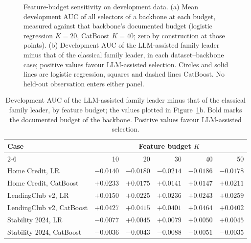 \documentclass[final,5p,twocolumn]{elsarticle}
\newcommand{\Kfeat}{K}
\begin{document}
\begin{figure}[htbp]
\caption{Feature-budget sensitivity on development data. (a) Mean development AUC of all selectors of a backbone at each budget, measured against that backbone's documented budget (logistic regression $\Kfeat=20$, CatBoost $\Kfeat=40$; zero by construction at those points). (b) Development AUC of the LLM-assisted family leader minus that of the classical family leader, in each dataset--backbone case; positive values favour LLM-assisted selection. Circles and solid lines are logistic regression, squares and dashed lines CatBoost. No held-out observation enters either panel.}
\label{fig:budgets}
\end{figure}

\begin{table}[htbp]
\centering
\footnotesize
\begin{threeparttable}
\caption{Development AUC of the LLM-assisted family leader minus that of the classical family leader, by feature budget; the values plotted in Figure~\ref{fig:budgets}b. Bold marks the documented budget of the backbone. Positive values favour LLM-assisted selection.}
\label{tab:budgets}
\setlength{\tabcolsep}{4pt}
\begin{tabular}{@{}lrrrrr@{}}
\toprule
Case & \multicolumn{5}{c}{Feature budget $\Kfeat$} \\
\cmidrule(l){2-6}
 & 10 & 20 & 30 & 40 & 50 \\
\midrule
Home Credit, LR & $-0.0140$ & $\mathbf{-0.0180}$ & $-0.0214$ & $-0.0186$ & $-0.0178$ \\
Home Credit, CatBoost & $+0.0233$ & $+0.0175$ & $+0.0141$ & $\mathbf{+0.0147}$ & $+0.0211$ \\
LendingClub v2, LR & $+0.0150$ & $\mathbf{+0.0225}$ & $+0.0236$ & $+0.0243$ & $+0.0259$ \\
LendingClub v2, CatBoost & $+0.0427$ & $+0.0415$ & $+0.0401$ & $\mathbf{+0.0464}$ & $+0.0402$ \\
Stability 2024, LR & $-0.0077$ & $\mathbf{+0.0045}$ & $+0.0079$ & $+0.0050$ & $+0.0045$ \\
Stability 2024, CatBoost & $-0.0036$ & $-0.0043$ & $-0.0088$ & $\mathbf{-0.0051}$ & $-0.0035$ \\
\bottomrule
\end{tabular}
\end{threeparttable}
\end{table}
\end{document}
